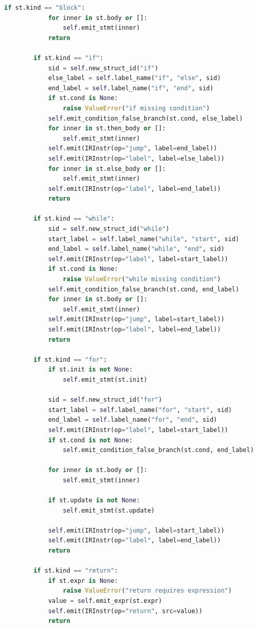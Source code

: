 \documentclass[12pt]{report}
\begin{document}
\begin{lstlisting}[language=Python]
        if st.kind == "block":
            for inner in st.body or []:
                self.emit_stmt(inner)
            return

        if st.kind == "if":
            sid = self.new_struct_id("if")
            else_label = self.label_name("if", "else", sid)
            end_label = self.label_name("if", "end", sid)
            if st.cond is None:
                raise ValueError("if missing condition")
            self.emit_condition_false_branch(st.cond, else_label)
            for inner in st.then_body or []:
                self.emit_stmt(inner)
            self.emit(IRInstr(op="jump", label=end_label))
            self.emit(IRInstr(op="label", label=else_label))
            for inner in st.else_body or []:
                self.emit_stmt(inner)
            self.emit(IRInstr(op="label", label=end_label))
            return

        if st.kind == "while":
            sid = self.new_struct_id("while")
            start_label = self.label_name("while", "start", sid)
            end_label = self.label_name("while", "end", sid)
            self.emit(IRInstr(op="label", label=start_label))
            if st.cond is None:
                raise ValueError("while missing condition")
            self.emit_condition_false_branch(st.cond, end_label)
            for inner in st.body or []:
                self.emit_stmt(inner)
            self.emit(IRInstr(op="jump", label=start_label))
            self.emit(IRInstr(op="label", label=end_label))
            return

        if st.kind == "for":
            if st.init is not None:
                self.emit_stmt(st.init)

            sid = self.new_struct_id("for")
            start_label = self.label_name("for", "start", sid)
            end_label = self.label_name("for", "end", sid)
            self.emit(IRInstr(op="label", label=start_label))
            if st.cond is not None:
                self.emit_condition_false_branch(st.cond, end_label)

            for inner in st.body or []:
                self.emit_stmt(inner)

            if st.update is not None:
                self.emit_stmt(st.update)

            self.emit(IRInstr(op="jump", label=start_label))
            self.emit(IRInstr(op="label", label=end_label))
            return

        if st.kind == "return":
            if st.expr is None:
                raise ValueError("return requires expression")
            value = self.emit_expr(st.expr)
            self.emit(IRInstr(op="return", src=value))
            return


\end{lstlisting}
\end{document}
